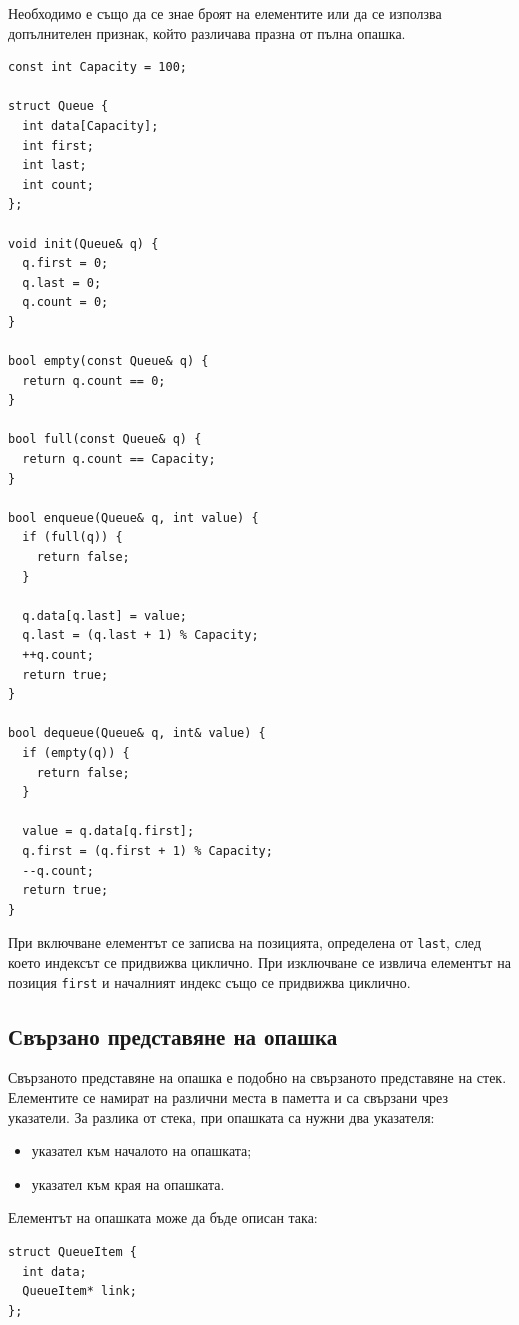 Необходимо е също да се знае броят на елементите или да се използва допълнителен признак, който различава празна от пълна опашка.

\begin{verbatim}
const int Capacity = 100;

struct Queue {
  int data[Capacity];
  int first;
  int last;
  int count;
};

void init(Queue& q) {
  q.first = 0;
  q.last = 0;
  q.count = 0;
}

bool empty(const Queue& q) {
  return q.count == 0;
}

bool full(const Queue& q) {
  return q.count == Capacity;
}

bool enqueue(Queue& q, int value) {
  if (full(q)) {
    return false;
  }

  q.data[q.last] = value;
  q.last = (q.last + 1) % Capacity;
  ++q.count;
  return true;
}

bool dequeue(Queue& q, int& value) {
  if (empty(q)) {
    return false;
  }

  value = q.data[q.first];
  q.first = (q.first + 1) % Capacity;
  --q.count;
  return true;
}
\end{verbatim}

При включване елементът се записва на позицията, определена от \verb|last|, след което индексът се придвижва циклично. При изключване се извлича елементът на позиция \verb|first| и началният индекс също се придвижва циклично.

\subsection{Свързано представяне на опашка}\label{s:18.4.2}

Свързаното представяне на опашка е подобно на свързаното представяне на стек. Елементите се намират на различни места в паметта и са свързани чрез указатели. За разлика от стека, при опашката са нужни два указателя:

\begin{itemize}
    \item указател към началото на опашката;
    \item указател към края на опашката.
\end{itemize}

Елементът на опашката може да бъде описан така:

\begin{verbatim}
struct QueueItem {
  int data;
  QueueItem* link;
};
\end{verbatim}

